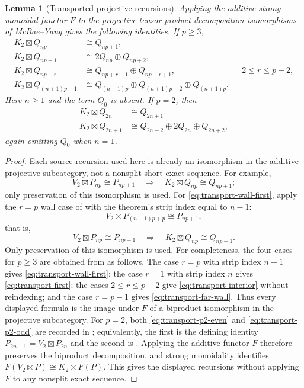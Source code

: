 \documentclass[12pt,leqno]{amsart}
\numberwithin{equation}{section}
\newtheorem{lem}[thm]{Lemma}
\newcommand{\boxt}{\boxtimes}
\begin{document}
\begin{lem}[Transported projective recursions]\label{lem:transported-recursions}
Applying the additive strong monoidal functor $F$ to the projective
tensor-product decomposition isomorphisms of McRae--Yang gives the
following identities.  If
$p\ge3$,
\begin{align}
 K_2\boxt Q_{np}&\cong Q_{np+1},\label{eq:transport-wall-first}\\
 K_2\boxt Q_{np+1}&\cong2Q_{np}\oplus Q_{np+2},\label{eq:transport-first}\\
 K_2\boxt Q_{np+r}&\cong Q_{np+r-1}\oplus Q_{np+r+1},
   &&2\le r\le p-2,\label{eq:transport-interior}\\
 K_2\boxt Q_{(n+1)p-1}&\cong
 Q_{(n-1)p}\oplus Q_{(n+1)p-2}\oplus Q_{(n+1)p}.
 \label{eq:transport-far-wall}
\end{align}
Here $n\ge1$ and the term $Q_0$ is absent.  If $p=2$, then
\begin{align}
 K_2\boxt Q_{2n}&\cong Q_{2n+1},\label{eq:transport-p2-even}\\
 K_2\boxt Q_{2n+1}&\cong
 Q_{2n-2}\oplus2Q_{2n}\oplus Q_{2n+2},
 \label{eq:transport-p2-odd}
\end{align}
again omitting $Q_0$ when $n=1$.
\end{lem}

\begin{proof}
Each source recursion used here is already an isomorphism in the additive
projective subcategory, not a nonsplit short exact sequence.  For example,
\[
 V_2\boxtimes P_{np}\cong P_{np+1}
 \quad\Longrightarrow\quad
 K_2\boxtimes Q_{np}\cong Q_{np+1};
\]
only preservation of this isomorphism is used.  For \eqref{eq:transport-wall-first}, apply the $r=p$ wall case of
\cite[Theorem~4.8]{McRaeYang} with the theorem's strip index equal to
$n-1$:
\[
 V_2\boxtimes P_{(n-1)p+p}\cong P_{np+1},
\]
that is,
\[
 V_2\boxtimes P_{np}\cong P_{np+1}
 \quad\Longrightarrow\quad
 K_2\boxtimes Q_{np}\cong Q_{np+1}.
\]
Only preservation of this isomorphism is used.  For completeness, the
four cases for $p\ge3$ are obtained from \cite[Theorem~4.8]{McRaeYang}
as follows.  The case $r=p$ with strip index $n-1$ gives
\eqref{eq:transport-wall-first}; the case $r=1$ with strip index $n$
gives \eqref{eq:transport-first}; the cases $2\le r\le p-2$ give
\eqref{eq:transport-interior} without reindexing; and the case $r=p-1$
gives \eqref{eq:transport-far-wall}.  Thus every displayed formula is
the image under $F$ of a biproduct isomorphism in the projective
subcategory.  For $p=2$, both \eqref{eq:transport-p2-even} and
\eqref{eq:transport-p2-odd} are recorded in
\cite[Theorem~1.4(1)]{McRaeYang}; equivalently, the first is the defining
identity $P_{2n+1}=V_2\boxtimes P_{2n}$ and the second is
\cite[Theorem~4.3]{McRaeYang}.  Applying the additive functor $F$ therefore preserves the biproduct decomposition,
and strong monoidality identifies
$F(V_2\boxtimes P)\cong K_2\boxtimes F(P)$.  This gives the displayed
recursions without applying $F$ to any nonsplit exact sequence.
\end{proof}
\end{document}
